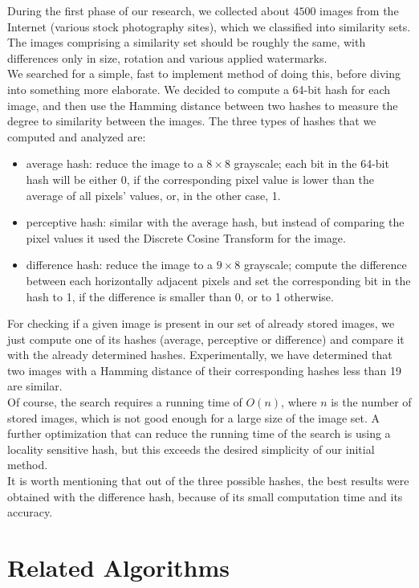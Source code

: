 \documentclass[conference]{IEEEtran}
\begin{document}
During the first phase of our research, we collected about $4500$ images from the Internet (various stock photography sites), which we classified into similarity sets. The images comprising a similarity set should be roughly the same, with differences only in size, rotation and various applied
watermarks.\\
We searched for a simple, fast to implement method of doing this, before diving into something more elaborate.
We decided to compute a 64-bit hash for each image, and then use the Hamming distance between two hashes to measure the degree
to similarity between the images. The three types of hashes that we computed and analyzed are:
\begin{itemize}
  \item average hash: reduce the image to a $8\times8$ grayscale; each bit in the 64-bit hash will be either 0, if the corresponding
  pixel value is lower than the average of all pixels' values, or, in the other case, 1.
  \item perceptive hash: similar with the average hash, but instead of comparing the pixel values it used the Discrete Cosine Transform
  for the image.
  \item difference hash: reduce the image to a $9\times8$ grayscale; compute the difference between each horizontally adjacent pixels and
  set the corresponding bit in the hash to 1, if the difference is smaller than 0, or to 1 otherwise.
\end{itemize}

For checking if a given image is present in our set of already stored images, we just compute one of its hashes (average, perceptive
or difference) and compare it with the already determined hashes. Experimentally, we have determined that two images with a Hamming
distance of their corresponding hashes less than 19 are similar.\\
Of course, the search requires a running time of $O(n)$, where $n$ is the number of stored images, which is not good enough for a large
size of the image set. A further optimization that can reduce the running time of the search is using a locality sensitive hash, but this
exceeds the desired simplicity of our initial method.\\
It is worth mentioning that out of the three possible hashes, the best results were obtained with the difference hash, because of its
small computation time and its accuracy.


\section{Related Algorithms}
\end{document}
